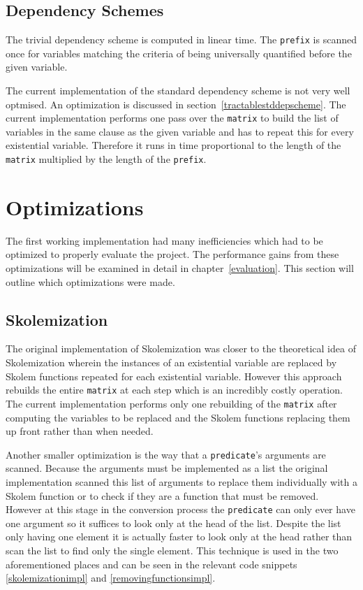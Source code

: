 \subsection{Dependency Schemes} \label{depschemecomplexity}
The trivial dependency scheme is computed in linear time. The \texttt{prefix} is scanned once for variables matching the criteria of being universally quantified before the given variable.

The current implementation of the standard dependency scheme is not very well optmised. An optimization is discussed in section~\ref{tractablestddepscheme}. The current implementation performs one pass over the \texttt{matrix} to build the list of variables in the same clause as the given variable and has to repeat this for every existential variable. Therefore it runs in time proportional to the length of the \texttt{matrix} multiplied by the length of the \texttt{prefix}.

\section{Optimizations} \label{optimizations}
The first working implementation had many inefficiencies which had to be optimized to properly evaluate the project. The performance gains from these optimizations will be examined in detail in chapter~\ref{evaluation}. This section will outline which optimizations were made.

\subsection{Skolemization}
The original implementation of Skolemization was closer to the theoretical idea of Skolemization wherein the instances of an existential variable are replaced by Skolem functions repeated for each existential variable. However this approach rebuilds the entire \texttt{matrix} at each step which is an incredibly costly operation. The current implementation performs only one rebuilding of the \texttt{matrix} after computing the variables to be replaced and the Skolem functions replacing them up front rather than when needed.

Another smaller optimization is the way that a \texttt{predicate}'s arguments are scanned. Because the arguments must be implemented as a list the original implementation scanned this list of arguments to replace them individually with a Skolem function or to check if they are a function that must be removed. However at this stage in the conversion process the \texttt{predicate} can only ever have one argument so it suffices to look only at the head of the list. Despite the list only having one element it is actually faster to look only at the head rather than scan the list to find only the single element. This technique is used in the two aforementioned places and can be seen in the relevant code snippets \ref{skolemizationimpl} and \ref{removingfunctionsimpl}.

